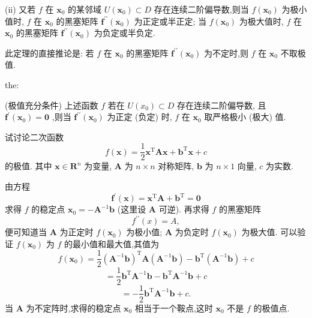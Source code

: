 (ii) 又若 \(f\) 在 \({\mathbf{x}}_{0}\) 的某邻域 \(U\left( {\mathbf{x}}_{0}\right)  \subset  D\) 存在连续二阶偏导数,则当 \(f\left( {\mathbf{x}}_{0}\right)\) 为极小值时, \(f\) 在 \({\mathbf{x}}_{0}\) 的黑塞矩阵 \({\mathbf{f}}^{\prime \prime }\left( {\mathbf{x}}_{0}\right)\) 为正定或半正定; 当 \(f\left( {\mathbf{x}}_{0}\right)\) 为极大值时, \(f\) 在 \({\mathbf{x}}_{0}\) 的黑塞矩阵 \({\mathbf{f}}^{\prime \prime }\left( {\mathbf{x}}_{0}\right)\) 为负定或半负定.

此定理的直接推论是: 若 \(f\) 在 \({\mathbf{x}}_{0}\) 的黑塞矩阵 \({\mathbf{f}}^{\prime \prime }\left( {\mathbf{x}}_{0}\right)\) 为不定时,则 \(f\) 在 \({\mathbf{x}}_{0}\) 不取极值.

\begin{theorem}{}{the:}

\end{theorem}
(极值充分条件) 上述函数 \(f\) 若在 \(U\left( {x}_{0}\right)  \subset  D\) 存在连续二阶偏导数, 且 \({\mathbf{f}}^{\prime }\left( {\mathbf{x}}_{0}\right)  = \mathbf{0}\) ,则当 \({\mathbf{f}}^{\prime \prime }\left( {\mathbf{x}}_{0}\right)\) 为正定 (负定) 时, \(f\) 在 \({\mathbf{x}}_{0}\) 取严格极小 (极大) 值.

\begin{example}

\end{example}
试讨论二次函数
\[
f\left( \mathbf{x}\right)  = \frac{1}{2}{\mathbf{x}}^{\mathrm{T}}\mathbf{A}\mathbf{x} + {\mathbf{b}}^{\mathrm{T}}\mathbf{x} + c \tag{21}
\]
的极值. 其中 \(\mathbf{x} \in  {\mathbf{R}}^{n}\) 为变量, \(\mathbf{A}\) 为 \(n \times  n\) 对称矩阵, \(\mathbf{b}\) 为 \(n \times  1\) 向量, \(c\) 为实数.

\begin{solution}

\end{solution}
由方程
\[
{\mathbf{f}}^{\prime }\left( \mathbf{x}\right)  = {\mathbf{x}}^{\mathrm{T}}\mathbf{A} + {\mathbf{b}}^{\mathrm{T}} = \mathbf{0}
\]
求得 \(f\) 的稳定点 \({\mathbf{x}}_{0} =  - {\mathbf{A}}^{-1}\mathbf{b}\) (这里设 \(\mathbf{A}\) 可逆). 再求得 \(f\) 的黑塞矩阵
\[
{f}^{\prime \prime }\left( x\right)  = A,
\]
便可知道当 \(\mathbf{A}\) 为正定时 \(f\left( {\mathbf{x}}_{0}\right)\) 为极小值; \(\mathbf{A}\) 为负定时 \(f\left( {\mathbf{x}}_{0}\right)\) 为极大值. 可以验证 \(f\left( {\mathbf{x}}_{0}\right)\) 为 \(f\) 的最小值和最大值,其值为
\[
f\left( {\mathbf{x}}_{0}\right)  = \frac{1}{2}{\left( {\mathbf{A}}^{-1}\mathbf{b}\right) }^{\mathrm{T}}\mathbf{A}\left( {{\mathbf{A}}^{-1}\mathbf{b}}\right)  - {\mathbf{b}}^{\mathrm{T}}\left( {{\mathbf{A}}^{-1}\mathbf{b}}\right)  + c
\]
\[
= \frac{1}{2}{\mathbf{b}}^{\mathrm{T}}{\mathbf{A}}^{-1}\mathbf{b} - {\mathbf{b}}^{\mathrm{T}}{\mathbf{A}}^{-1}\mathbf{b} + c
\]
\[
=  - \frac{1}{2}{\mathbf{b}}^{\mathrm{T}}{\mathbf{A}}^{-1}\mathbf{b} + c.
\]
当 \(\mathbf{A}\) 为不定阵时,求得的稳定点 \({\mathbf{x}}_{0}\) 相当于一个鞍点,这时 \({\mathbf{x}}_{0}\) 不是 \(f\) 的极值点.

